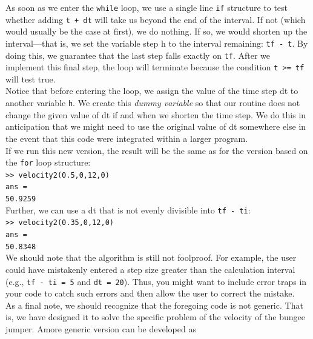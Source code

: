 \documentclass[../main.tex]{subfiles}
\begin{document}
As soon as we enter the \texttt{while} loop, we use a single line \texttt{if} structure to test whether
adding \texttt{t + dt} will take us beyond the end of the interval. If not (which would usually be
the case at first), we do nothing. If so, we would shorten up the interval---that is, we set the
variable step h to the interval remaining: \texttt{tf - t}. By doing this, we guarantee that the last
step falls exactly on \texttt{tf}. After we implement this final step, the loop will terminate because
the condition \texttt{t >= tf} will test true.\\
\indent Notice that before entering the loop, we assign the value of the time step dt to another
variable \texttt{h}. We create this \emph{dummy variable} so that our routine does not change the given
value of dt if and when we shorten the time step. We do this in anticipation that we might
need to use the original value of dt somewhere else in the event that this code were integrated
within a larger program.\\
\indent If we run this new version, the result will be the same as for the version based on the
\texttt{for} loop structure:\\

\texttt{>> velocity2(0.5,0,12,0)\\
\indent ans =\\
\indent\hspace{2mm} 50.9259}\\

\noindent Further, we can use a dt that is not evenly divisible into \texttt{tf - ti}:\\

\texttt{>> velocity2(0.35,0,12,0)\\
\indent ans =\\
\indent\hspace{2mm} 50.8348}\\

We should note that the algorithm is still not foolproof. For example, the user could
have mistakenly entered a step size greater than the calculation interval (e.g., \texttt{tf - ti = 5}
and \texttt{dt = 20}). Thus, you might want to include error traps in your code to catch such errors
and then allow the user to correct the mistake.\\

As a final note, we should recognize that the foregoing code is not generic. That is, we
have designed it to solve the specific problem of the velocity of the bungee jumper. Amore
generic version can be developed as\\
\end{document}
